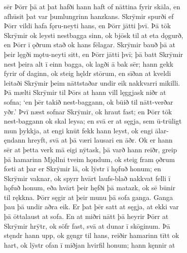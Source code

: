\documentclass[12pt,letterpaper]{book}
\begin{document}
\begin{linenumbers}
sēr Þōrr þā at þat hafði hann haft of nāttina fyrir skāla, en\\
afhūsit þat var þumlungrinn hanzkans.  Skrȳmir spurði ef\\
Þōrr vildi hafa fǫru-neyti hans, en Þōrr jātti þvī.  Þā tōk\\
Skrȳmir ok leysti nestbagga sinn, ok bjōsk til at eta dǫgurð,\\
en Þōrr ī ǫðrum stað ok hans fēlagar.  Skrȳmir bauð þā at\\
þeir lęgði mǫtu-neyti sitt, en Þōrr jātti þvī; þā batt Skrȳmir\\
nest þeira alt ī einn bagga, ok lagði ā bak sēr; hann gekk\\
fyrir of daginn, ok steig hęldr stōrum, en sīðan at kveldi\\
leitaði Skrȳmir þeim nāttstaðar undir eik nakkvarri mikilli.\\
Þā mælti Skrȳmir til Þōrs at hann vill lęggjask niðr at\\
sofna; `en þēr takið nest-baggann, ok būið til nātt-verðar\\
yðr.'  Þvī næst sofnar Skrȳmir, ok hraut fast; en Þōrr tōk\\
nest-baggann ok skal leysa; en svā er at sęgja, sem ū-trūligt\\
mun þykkja, at engi knūt fekk hann leyst, ok engi ālar-\\
ęndann hreyft, svā at þā væri lausari en āðr.  Ok er hann\\
sēr at þetta verk mā eigi nȳtask, þā varð hann reiðr, greip\\
þā hamarinn Mjǫllni tveim hǫndum, ok steig fram ǫðrum\\
fœti at þar er Skrȳmir lā, ok lȳstr ī hǫfuð honum; en\\
Skrȳmir vaknar, ok spyrr hvārt laufs-blað nakkvat felli ī\\
hǫfuð honum, eða hvārt þeir hęfði þā matazk, ok sē būnir\\
til rękkna.  Þōrr sęgir at þeir munu þā sofa ganga.  Ganga\\
þau þā undir aðra eik.  Er þat þēr satt at sęgja, at ekki var\\
þā ōttalaust at sofa.  En at miðri nātt þā heyrir Þōrr at\\
Skrȳmir hrȳtr, ok söfr fast, svā at dunar ī skōginum.  Þā\\
stęndr hann upp, ok gęngr til hans, reiðir hamarinn tītt ok\\
hart, ok lȳstr ofan ī miðjan hvirfil honum; hann kęnnir at\\

\end{linenumbers}
\end{document}
